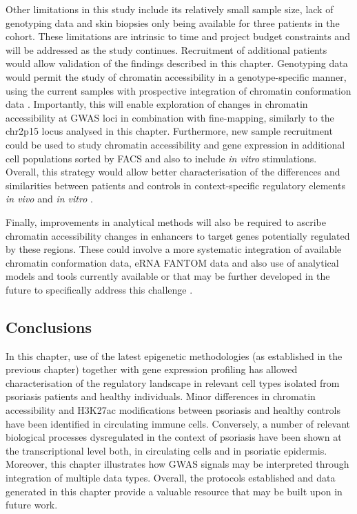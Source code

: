 Other limitations in this study include its relatively small sample size, lack of genotyping data and skin biopsies only being available for three patients in the cohort. These limitations are intrinsic to time and project budget constraints and will be addressed as the study continues. Recruitment of additional patients would allow validation of the findings described in this chapter. Genotyping data would permit the study of chromatin accessibility in a genotype-specific manner, using the current samples with prospective integration of chromatin conformation data \parencite{Kumasaka2018}. Importantly, this will enable exploration of changes in chromatin accessibility at GWAS loci in combination with fine-mapping, similarly to the chr2p15 locus analysed in this chapter. Furthermore, new sample recruitment could be used to study chromatin accessibility and gene expression in additional cell populations sorted by FACS and also to include \textit{in vitro} stimulations. Overall, this strategy would allow better characterisation of the differences and similarities between patients and controls in context-specific regulatory elements \textit{in vivo} and \textit{in vitro} \parencite{Peeters2015}.

Finally, improvements in analytical methods will also be required to ascribe chromatin accessibility changes in enhancers to target genes potentially regulated by these regions. These could involve a more systematic integration of available chromatin conformation data, eRNA FANTOM data and also use of analytical models and tools currently available or that may be further developed in the future to specifically address this challenge \parencite{Wang2016,Cao2018}.

\subsection{Conclusions}
In this chapter, use of the latest epigenetic methodologies (as established in the previous chapter) together with gene expression profiling has allowed characterisation of the regulatory landscape in relevant cell types isolated from psoriasis patients and healthy individuals. Minor differences in chromatin accessibility and H3K27ac modifications between psoriasis and healthy controls have been identified in circulating immune cells. Conversely, a number of relevant biological processes dysregulated in the context of psoriasis have been shown at the transcriptional level both, in circulating cells and in psoriatic epidermis. Moreover, this chapter illustrates how GWAS signals may be interpreted through integration of multiple data types. Overall, the protocols established and data generated in this chapter provide a valuable resource that may be built upon in future work.


